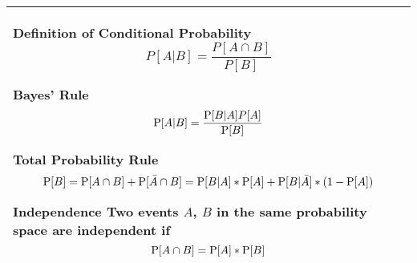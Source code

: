 {\tabulinesep=1mm
\begin{tabu}{|p{16cm} |}
\hline
\vspace{2 mm}
\textbf{Definition of Conditional Probability}
$$P[A | B] = \frac{P[A \cap B]}{P[B]}$$

\textbf{Bayes' Rule} 
\[ \P[A|B] = \frac{\P[B|A]P[A]}{\P[B]} \]

\textbf{Total Probability Rule}
\[ \P[B] = \P[A \cap B] + \P[ \bar{A} \cap B] = \P[B|A] * \P[A] + 
\P[B|\bar{A}]*(1 - \P[A])\]

\textbf{Independence} \newline 
Two events $A$, $B$ in the same probability space are independent if 
\[\P[A \cap B] = \P[A] * \P[B] \]
\\
\hline
\end{tabu}
}
